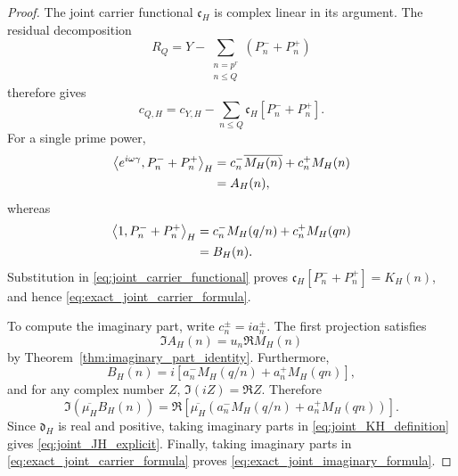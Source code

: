 \documentclass[11pt]{amsart}
\numberwithin{equation}{section}
\theoremstyle{plain}
\theoremstyle{definition}
\theoremstyle{remark}
\newcommand{\1}{\mathbf{1}}
\begin{document}
\begin{proof}
The joint carrier functional \(\mathfrak c_H\) is complex linear in its
argument.  The residual decomposition
\begin{equation}
R_Q
=
Y-
\sum_{\substack{n=p^r\\n\leq Q}}
\left(P_n^-+P_n^+\right)
\label{eq:joint_residual_linear_decomposition}
\end{equation}
therefore gives
\begin{equation}
c_{Q,H}
=
c_{Y,H}
-
\sum_{n\leq Q}
\mathfrak c_H[P_n^-+P_n^+].
\label{eq:joint_linearity_step}
\end{equation}
For a single prime power,
\begin{align}
\left\langle e^{i\omega\gamma},
P_n^-+P_n^+\right\rangle_H
&=
c_n^-\overline{M_H(n)}+c_n^+M_H(n)
\label{eq:joint_prime_carrier_projection}
\\
&=
A_H(n),
\notag
\end{align}
whereas
\begin{align}
\left\langle1,P_n^-+P_n^+\right\rangle_H
&=
c_n^-M_H(q/n)+c_n^+M_H(qn)
\label{eq:joint_prime_constant_projection}
\\
&=
B_H(n).
\notag
\end{align}
Substitution in \eqref{eq:joint_carrier_functional} proves
\(\mathfrak c_H[P_n^-+P_n^+]=K_H(n)\), and hence
\eqref{eq:exact_joint_carrier_formula}.

To compute the imaginary part, write \(c_n^\pm=ia_n^\pm\).  The first
projection satisfies
\begin{equation}
\Im A_H(n)=u_n\Re M_H(n)
\label{eq:joint_AH_imaginary}
\end{equation}
by Theorem~\ref{thm:imaginary_part_identity}.  Furthermore,
\begin{equation}
B_H(n)
=
i\left[
a_n^-M_H(q/n)+a_n^+M_H(qn)
\right],
\label{eq:joint_BH_real_coefficients}
\end{equation}
and for any complex number \(Z\),
\(\Im(iZ)=\Re Z\).  Therefore
\begin{equation}
\Im\!\left(\overline{\mu_H}B_H(n)\right)
=
\Re\!\left[
\overline{\mu_H}
\left(
a_n^-M_H(q/n)+a_n^+M_H(qn)
\right)
\right].
\label{eq:joint_projection_imaginary_correction}
\end{equation}
Since \(\mathfrak d_H\) is real and positive, taking imaginary parts in
\eqref{eq:joint_KH_definition} gives
\eqref{eq:joint_JH_explicit}.  Finally, taking imaginary parts in
\eqref{eq:exact_joint_carrier_formula} proves
\eqref{eq:exact_joint_imaginary_formula}.
\end{proof}
\end{document}
